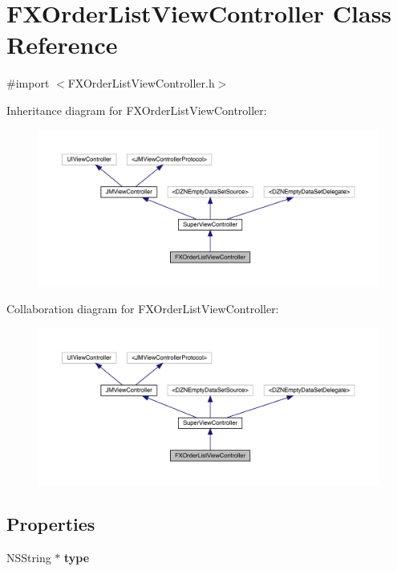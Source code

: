 \hypertarget{interface_f_x_order_list_view_controller}{}\section{F\+X\+Order\+List\+View\+Controller Class Reference}
\label{interface_f_x_order_list_view_controller}


{\ttfamily \#import $<$F\+X\+Order\+List\+View\+Controller.\+h$>$}



Inheritance diagram for F\+X\+Order\+List\+View\+Controller\+:\nopagebreak
\begin{figure}[H]
\begin{center}
\leavevmode
\includegraphics[width=350pt]{interface_f_x_order_list_view_controller__inherit__graph}
\end{center}
\end{figure}


Collaboration diagram for F\+X\+Order\+List\+View\+Controller\+:\nopagebreak
\begin{figure}[H]
\begin{center}
\leavevmode
\includegraphics[width=350pt]{interface_f_x_order_list_view_controller__coll__graph}
\end{center}
\end{figure}
\subsection*{Properties}
\begin{DoxyCompactItemize}
\item 
\mbox{\label{interface_f_x_order_list_view_controller_aa2056fec1da578aecd4a897794d24262}} 
N\+S\+String $\ast$ {\bfseries type}
\end{DoxyCompactItemize}
